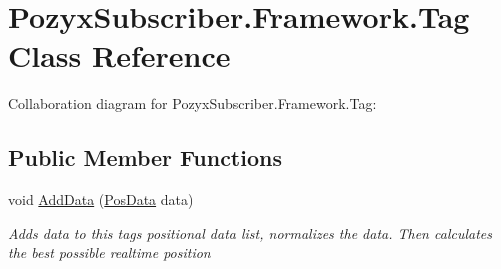 \hypertarget{class_pozyx_subscriber_1_1_framework_1_1_tag}{}\section{Pozyx\+Subscriber.\+Framework.\+Tag Class Reference}
\label{class_pozyx_subscriber_1_1_framework_1_1_tag}


Collaboration diagram for Pozyx\+Subscriber.\+Framework.\+Tag\+:
\subsection*{Public Member Functions}
\begin{DoxyCompactItemize}
\item 
void \hyperlink{class_pozyx_subscriber_1_1_framework_1_1_tag_a3d46f90b9f7f701bda3a25639c31d392}{Add\+Data} (\hyperlink{struct_pozyx_subscriber_1_1_framework_1_1_pos_data}{Pos\+Data} data)
\begin{DoxyCompactList}\small\item\em Adds data to this tag\textquotesingle{}s positional data list, normalizes the data. Then calculates the best possible realtime position \end{DoxyCompactList}\end{DoxyCompactItemize}
